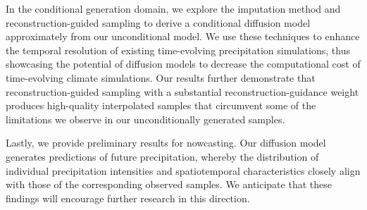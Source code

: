 \documentclass[ oneside,%
                    author={George Herbert},
                    degree={MSci},
                     title={Diffusion Models for Time-Evolving Precipitation Fields},
                  subtitle={}]{dissertation}
\begin{document}
In the conditional generation domain, we explore the imputation method and reconstruction-guided sampling to derive a conditional diffusion model approximately from our unconditional model. We use these techniques to enhance the temporal resolution of existing time-evolving precipitation simulations, thus showcasing the potential of diffusion models to decrease the computational cost of time-evolving climate simulations. Our results further demonstrate that reconstruction-guided sampling with a substantial reconstruction-guidance weight produces high-quality interpolated samples that circumvent some of the limitations we observe in our unconditionally generated samples.

Lastly, we provide preliminary results for nowcasting. Our diffusion model generates predictions of future precipitation, whereby the distribution of individual precipitation intensities and spatiotemporal characteristics closely align with those of the corresponding observed samples. We anticipate that these findings will encourage further research in this direction.





\end{document}
